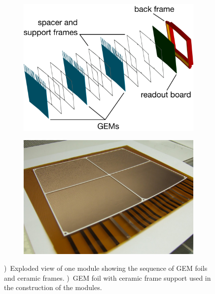 \begin{figure}[htb!]
\begin{subfigure}[b]{0.48\textwidth}
\includegraphics[width=\textwidth]{Tracker/TPC_Bonn/plots/TPC-DG_GemModule_Explosion.pdf}
\caption{}
\label{sfig:moduleExp}
\end{subfigure}
\hfill
\begin{subfigure}[b]{0.48\textwidth}
\includegraphics[width=\textwidth]{Tracker/TPC_Bonn/plots/TPC-DG_GemGrid.png}
\caption{}
\label{sfig:moduleGEM}
\end{subfigure}
\caption [Readout Module GEM]{\small \protect{})~Exploded view of one module showing the sequence of GEM foils and ceramic frames. \protect{})~GEM foil with ceramic frame support used in the construction of the modules.}
\label{fig:moduleAssembled}
\end{figure}

